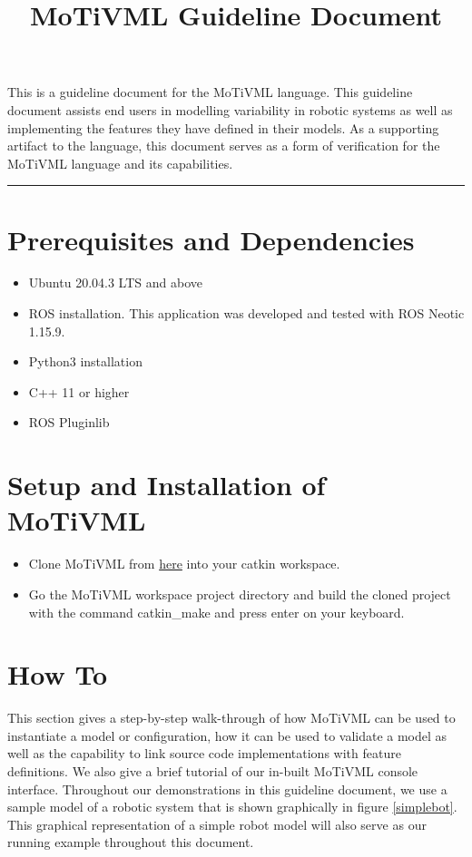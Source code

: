 \documentclass{article}
\title{MoTiVML Guideline Document}
\author{}
\date{}
\begin{document}
\maketitle
This is a guideline document for the MoTiVML language. This guideline document assists end users in modelling variability in robotic systems as well as implementing the features they have defined in their models. As a supporting artifact to the language,  this document serves as a form of verification for the MoTiVML language and its capabilities.

\noindent\rule{17cm}{0.4pt}

\label{guide:docs}
\section{Prerequisites and Dependencies}
    \begin{itemize}
        \item Ubuntu 20.04.3 LTS and above
        \item ROS installation. This application was developed and tested with ROS Neotic 1.15.9.
        \item Python3 installation
        \item C++ 11 or higher
        \item ROS Pluginlib
    \end{itemize}

\section{Setup and Installation of MoTiVML}
\begin{itemize}
    \item Clone MoTiVML from \href{https://github.com/SergioGarG/sera-extension}{here} into your catkin workspace.
    \item Go the MoTiVML workspace project directory and build the cloned project with the command catkin\_make and press enter on your keyboard.
\end{itemize}

\section{How To}
This section gives a step-by-step walk-through of how MoTiVML can be used to instantiate a model or configuration, how it can be used to validate a model as well as the capability to link source code implementations with feature definitions. We also give a brief tutorial of our in-built MoTiVML console interface. Throughout our demonstrations in this guideline document, we use a sample model of a robotic system that is shown graphically in figure \ref{simplebot}. This graphical representation of a simple robot model will also serve as our running example throughout this document.
\end{document}
